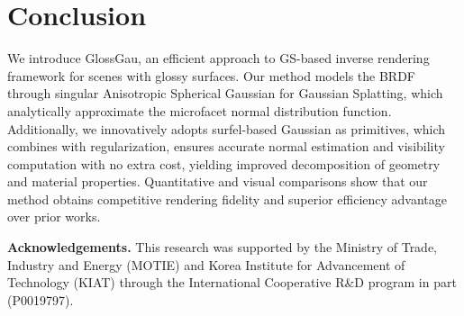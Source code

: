 \section{Conclusion}

We introduce GlossGau, an efficient approach to GS-based inverse rendering framework for scenes with glossy surfaces. Our method models the BRDF through singular Anisotropic Spherical Gaussian for Gaussian Splatting, which analytically approximate the microfacet normal distribution function. Additionally, we innovatively adopts surfel-based Gaussian as primitives, which combines with regularization, ensures accurate normal estimation and visibility computation with no extra cost, yielding improved decomposition of geometry and material properties. Quantitative and visual comparisons show that our method obtains competitive rendering fidelity and superior efficiency advantage over prior works. 


\noindent\textbf{Acknowledgements.} This research was supported by the Ministry of Trade, Industry and Energy (MOTIE) and Korea Institute for Advancement of Technology (KIAT) through the International Cooperative R\&D program in part (P0019797). 